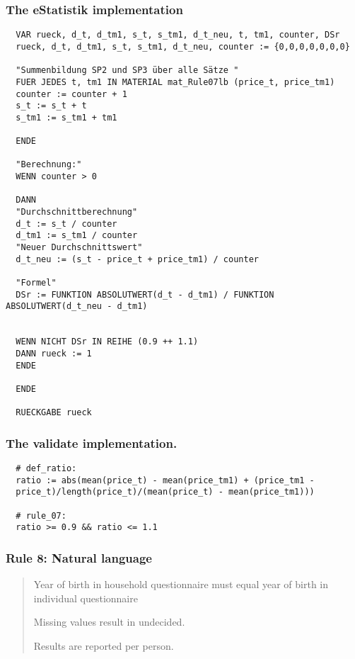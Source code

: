\subsubsection*{The eStatistik implementation}
\begin{verbatim}
  VAR rueck, d_t, d_tm1, s_t, s_tm1, d_t_neu, t, tm1, counter, DSr
  rueck, d_t, d_tm1, s_t, s_tm1, d_t_neu, counter := {0,0,0,0,0,0,0}

  "Summenbildung SP2 und SP3 über alle Sätze "
  FUER JEDES t, tm1 IN MATERIAL mat_Rule07lb (price_t, price_tm1)
  counter := counter + 1
  s_t := s_t + t
  s_tm1 := s_tm1 + tm1

  ENDE

  "Berechnung:"
  WENN counter > 0

  DANN
  "Durchschnittberechnung"
  d_t := s_t / counter
  d_tm1 := s_tm1 / counter
  "Neuer Durchschnittswert"
  d_t_neu := (s_t - price_t + price_tm1) / counter

  "Formel"
  DSr := FUNKTION ABSOLUTWERT(d_t - d_tm1) / FUNKTION ABSOLUTWERT(d_t_neu - d_tm1)


  WENN NICHT DSr IN REIHE (0.9 ++ 1.1)
  DANN rueck := 1
  ENDE

  ENDE

  RUECKGABE rueck
\end{verbatim}
\subsubsection*{The validate implementation.}
\begin{verbatim}
  # def_ratio:
  ratio := abs(mean(price_t) - mean(price_tm1) + (price_tm1 -
  price_t)/length(price_t)/(mean(price_t) - mean(price_tm1)))

  # rule_07:
  ratio >= 0.9 && ratio <= 1.1
\end{verbatim}


\newpage

\subsubsection*{  Rule 8: Natural language}
\begin{quote}


Year of birth in household questionnaire must equal year of birth in individual questionnaire

Missing values result in undecided.

Results are reported per person.


\end{quote}
